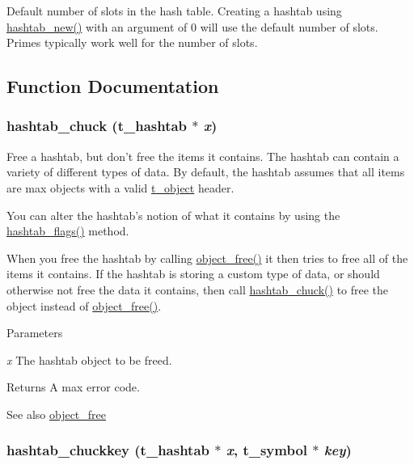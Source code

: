 Default number of slots in the hash table. Creating a hashtab using \hyperlink{group__hashtab_ga70be9bbfb9bd9383824df0832477267f}{hashtab\_\-new()} with an argument of 0 will use the default number of slots. Primes typically work well for the number of slots. 

\subsection{Function Documentation}
\hypertarget{group__hashtab_gac3203c76c8321cde39088beab8b4d2e8}{
\subsubsection[{hashtab\_\-chuck}]{ hashtab\_\-chuck ({\bf t\_\-hashtab} $\ast$ {\em x})}}
\label{group__hashtab_gac3203c76c8321cde39088beab8b4d2e8}


Free a hashtab, but don't free the items it contains. The hashtab can contain a variety of different types of data. By default, the hashtab assumes that all items are max objects with a valid \hyperlink{structt__object}{t\_\-object} header.

You can alter the hashtab's notion of what it contains by using the \hyperlink{group__hashtab_gaaaefb350afdfdbe1440dd6401ac56eb7}{hashtab\_\-flags()} method.

When you free the hashtab by calling \hyperlink{group__obj_ga3759846cb356195532c41e35b87522ee}{object\_\-free()} it then tries to free all of the items it contains. If the hashtab is storing a custom type of data, or should otherwise not free the data it contains, then call \hyperlink{group__hashtab_gac3203c76c8321cde39088beab8b4d2e8}{hashtab\_\-chuck()} to free the object instead of \hyperlink{group__obj_ga3759846cb356195532c41e35b87522ee}{object\_\-free()}.


\begin{DoxyParams}{Parameters}
\item[{\em x}]The hashtab object to be freed. \end{DoxyParams}
\begin{DoxyReturn}{Returns}
A max error code. 
\end{DoxyReturn}
\begin{DoxySeeAlso}{See also}
\hyperlink{group__obj_ga3759846cb356195532c41e35b87522ee}{object\_\-free} 
\end{DoxySeeAlso}
\hypertarget{group__hashtab_ga9bbf0199ef8b92a977b3bee5fd746799}{
\subsubsection[{hashtab\_\-chuckkey}]{ hashtab\_\-chuckkey ({\bf t\_\-hashtab} $\ast$ {\em x}, \/  {\bf t\_\-symbol} $\ast$ {\em key})}}
\label{group__hashtab_ga9bbf0199ef8b92a977b3bee5fd746799}


